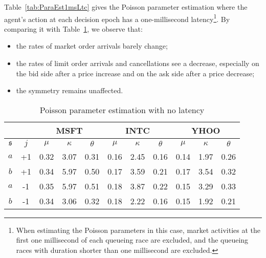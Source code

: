 \documentclass{amsart}[11pt]
\numberwithin{equation}{section}
\theoremstyle{definition}
\newcommand{\ssf}{\mathfrak{s}}
\begin{document}
Table~\ref{tab:ParaEst1msLtc} gives the Poisson parameter estimation where the agent's action at each decision epoch has a one-millisecond latency\footnote{When estimating the Poisson parameters in this case, market activities at the first one millisecond of each queueing race are excluded,
and the queueing races with duration shorter than one millisecond are excluded.}. 
By comparing it with Table~\ref{tab:ParaEst0msLtc}, we observe that:
\begin{itemize}
\item the rates of market order arrivals barely change;
\item the rates of limit order arrivals and cancellations see a decrease,
especially on the bid side after a price increase and on the ask side after a price decrease;
\item the symmetry remains unaffected.
\end{itemize}

\begin{table}[!htp]
\centering
\begin{tabular}{|c|c|c|c|c|c|c|c|c|c|c|}
\hline
\multicolumn{2}{|c|}{ } & \multicolumn{3}{|c|}{MSFT}&\multicolumn{3}{|c|}{INTC} & \multicolumn{3}{|c|}{YHOO}\\
\hline
$\ssf$ & $j$ & $\mu$ & $\kappa$ & $\theta$ & $\mu$ & $\kappa$ & $\theta$ &$\mu$ & $\kappa$ & $\theta$\\
\hline
$a$  & +1 & 0.32 &3.07  &0.31       & 0.16 & 2.45 & 0.16       & 0.14 & 1.97 & 0.26\\
$b$  & +1 & 0.34 & 5.97 &0.50       & 0.17 & 3.59  & 0.21       & 0.17 & 3.54  & 0.32\\
$a$  & -1  & 0.35 &5.97  & 0.51      & 0.18 & 3.87 &  0.22     & 0.15 & 3.29 &0.33 \\
$b$  & -1  &  0.34&3.06  &  0.32     & 0.18 & 2.22 &  0.16    & 0.15 & 1.92 &0.21 \\
\hline
\end{tabular}
\caption{Poisson parameter estimation with no latency}
\label{tab:ParaEst0msLtc}
\end{table}
\end{document}

